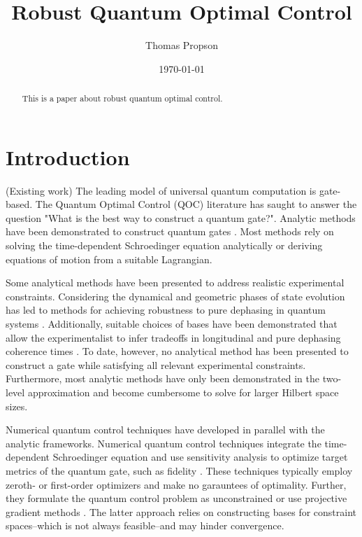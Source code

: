 \documentclass[
  amsfonts,
  amsmath,
  tbtags,
  amssymb,
  aps,
  nobibnotes,
  prl,
  twocolumn,
]{revtex4-2}
\begin{document}
\title{Robust Quantum Optimal Control}

\author{Thomas Propson}

\date{\today}


\begin{abstract}
  This is a paper about robust quantum optimal control.
\end{abstract}

\maketitle


\section{Introduction}
(Existing work) The leading model of universal
quantum computation is gate-based. The Quantum Optimal Control (QOC)
literature has saught to answer the question "What is the best way to construct a quantum gate?".
Analytic methods
have been demonstrated to construct quantum gates
\cite{zhang2020universal, huang2020engineering, han2020experimental,
  xu2020nonadiabatic, carlini2005quantum}.
Most methods rely on solving the time-dependent
Schroedinger equation analytically or deriving equations of motion
from a suitable Lagrangian.

Some analytical methods
have been presented to address realistic experimental constraints.
Considering the dynamical and geometric phases of state
evolution has led to methods for achieving
robustness to pure dephasing in quantum systems
\cite{xu2020nonadiabitc, han2020experimental, merrill2014progress}.
Additionally, suitable choices of bases have been demonstrated that
allow the experimentalist to infer tradeoffs in longitudinal
and pure dephasing coherence times \cite{huang2020engineering}.
To date, however, no analytical method has been presented
to construct a gate while satisfying all relevant experimental
constraints. Furthermore, most analytic methods have only
been demonstrated in the two-level approximation and become
cumbersome to solve for larger Hilbert space sizes.

Numerical quantum control techniques have developed in parallel
with the analytic frameworks. Numerical quantum control
techniques integrate the time-dependent Schroedinger
equation and use sensitivity analysis to optimize target metrics
of the quantum gate, such as fidelity
\cite{leung2017speedup,  goerz2019krotov, doria2011optimal,
  abdelhafez2019gradient, machnes2015gradient, leng2019robust}.
These techniques typically employ zeroth- or first-order
optimizers and make no garauntees of optimality.
Further, they formulate the quantum control
problem as unconstrained or use
projective gradient methods \cite{machnes2015gradient}.
The latter approach relies on constructing
bases for constraint spaces--which is not always feasible--and
may hinder convergence.
\end{document}
